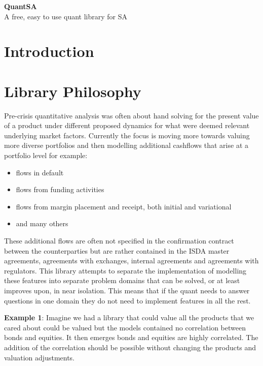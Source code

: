 \documentclass[a4paper,10pt]{article}
\begin{document}
\begin{center}
{\bf \LARGE QuantSA\\}
\normalsize A free, easy to use quant library for SA
\end{center}

\section{Introduction}

\section{Library Philosophy}
Pre-crisis quantitative analysis was often about hand solving for the present value of a product under different proposed dynamics for what were deemed relevant underlying market factors.  Currently the focus is moving more towards valuing more diverse portfolios and then modelling additional cashflows that arise at a portfolio level for example:
\begin{itemize}
	\item flows in default
	\item flows from funding activities
	\item flows from margin placement and receipt, both initial and variational
	\item and many others
\end{itemize}
These additional flows are often not specified in the confirmation contract between the counterparties but are rather contained in the ISDA master agreements, agreements with exchanges, internal agreements and agreements with regulators.  This library attempts to separate the implementation of modelling these features into separate problem domains that can be solved, or at least improves upon, in near isolation.  This means that if the quant needs to answer questions in one domain they do not need to implement features in all the rest.

\textbf{Example 1}: Imagine we had a library that could value all the products that we cared about could be valued but the models contained no correlation between bonds and equities.  It then emerges bonds and equities are highly correlated.  The addition of the correlation should be possible without changing the products and valuation adjustments.
\end{document}

